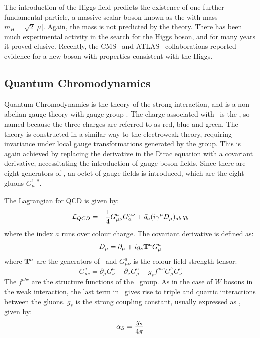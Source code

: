 The introduction of the Higgs field predicts the existence of one further
fundamental particle, a massive scalar boson known as the 
with mass $m_{H} = \sqrt{2}|\mu|$. Again, the mass is not predicted by the theory. 
There has
been much experimental activity in the search for the Higgs boson, and for many
years it proved elusive. Recently,
the CMS~\cite{CMS_Higgs:2012gu} and ATLAS~\cite{ATLAS_Higgs:2012gk} collaborations reported evidence for a new boson with
properties consistent with the Higgs.

\subsection{Quantum Chromodynamics}
\label{sec:qcd}

Quantum Chromodynamics is the theory of the strong interaction, and is a
non-abelian gauge theory with gauge group \suthree. The charge associated with
\suthree\ is the , so named because the three 
charges are referred to as red, blue and green. The theory is constructed
in a similar way to the electroweak theory, requiring invariance under
local gauge transformations generated by the group. This is again achieved by
replacing the derivative in the Dirac equation
with a covariant derivative, necessitating the introduction of gauge boson fields.
Since there are eight generators of \suthree, an octet of gauge fields is
introduced, which are the eight gluons $G_{\mu}^{1..8}$. 

The Lagrangian for QCD is
given by:
\begin{equation}
\mathcal{L}_{QCD} = -\frac{1}{4}G^{a}_{\mu\nu}G_{a}^{\mu\nu} +
\bar{q}_{a}(i\gamma^{\mu} D_{\mu})_{ab}\, q_{b}
\end{equation}
where the index $a$ runs over colour charge. The covariant derivative is defined
as:
\begin{equation}
D_{\mu}  =  \partial_{\mu} + ig_{s}{\bf T}^{a} G^{a}_{\mu}
\end{equation}
where ${\bf T}^{a}$ are the generators of \suthree\ and $G^{a}_{\mu\nu}$ is the colour field strength tensor:
\begin{equation}
 G^{a}_{\mu\nu} =
\partial_{\mu} G^{a}_{\nu} - \partial_{\nu} G^{a}_{\mu} - g_{s} f^{abc} G^{b}_{\mu}
G^{c}_{\nu}
\label{eqn:colour-field-strength}
\end{equation}
The $f^{abc}$ are the structure functions of the \suthree\ group. As in the case
of $W$ bosons in the weak interaction, the last term in~ gives rise to triple and quartic interactions
between the gluons. $g_{s}$ is the strong coupling constant, usually expressed
as \alphaS, given by:
\begin{equation}
\alphaS = \frac{g_{s}}{4\pi}
\end{equation}

